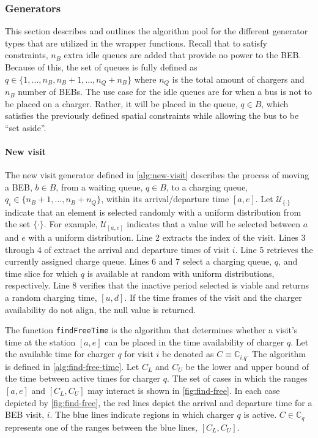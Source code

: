\documentclass[11pt,a4paper,final]{article}
\newcommand{\C}{\mathbb{C}}                 %
\newcommand{\U}{\mathcal{U}}                %
\begin{document}
\subsubsection{Generators}
\label{sec:generators}
This section describes and outlines the algorithm pool for the different generator types that are utilized in the
wrapper functions. Recall that to satisfy constraints, \(n_B\) extra idle queues are added that provide no power to the
BEB. Because of this, the set of queues is fully defined as \(q \in \{1,..., n_B, n_B+1,..., n_Q+n_B\}\) where \(n_Q\) is the
total amount of chargers and \(n_B\) number of BEBs. The use case for the idle queues are for when a bus is not to be
placed on a charger. Rather, it will be placed in the queue, \(q \in B\), which satisfies the previously defined spatial
constraints while allowing the bus to be ``set aside''.

\paragraph{New visit}
\label{sec:new-visit}
The new visit generator defined in \ref{alg:new-visit} describes the process of moving a BEB, \(b \in B\), from a waiting
queue, \(q \in B\), to a charging queue, \(q_i \in \{n_B+1,..., n_B + n_Q\}\), within its arrival/departure time \([a, e]\). Let
\(\U_{\{\cdot\}}\) indicate that an element is selected randomly with a uniform distribution from the set \(\{\cdot\}\). For
example, \(\U_{[a, e]}\) indicates that a value will be selected between \(a\) and \(e\) with a uniform distribution. Line 2
extracts the index of the visit. Lines 3 through 4 of extract the arrival and departure times of visit \(i\). Line 5
retrieves the currently assigned charge queue. Lines 6 and 7 select a charging queue, \(q\), and time slice for which \(q\)
is available at random with uniform distributions, respectively. Line 8 verifies that the inactive period selected is
viable and returns a random charging time, \([u, d]\). If the time frames of the visit and the charger availability do not
align, the null value is returned.

The function \texttt{findFreeTime} is the algorithm that determines whether a visit's time at the station \([a, e]\) can be placed
in the time availability of charger \(q\). Let the available time for charger \(q\) for visit \(i\) be denoted as \(C \equiv
\C_{i.q}\). The algorithm is defined in \ref{alg:find-free-time}. Let \(C_L\) and \(C_U\) be the lower and upper bound of the
time between active times for charger \(q\). The set of cases in which the ranges \([a, e]\) and \([C_L, C_U]\) may interact
is shown in \ref{fig:find-free}. In each case depicted by \ref{fig:find-free}, the red lines depict the arrival and departure time
for a BEB visit, \(i\). The blue lines indicate regions in which charger \(q\) is active. \(C \in \C_q\) represents one of the
ranges between the blue lines, \([C_L, C_U]\).
\end{document}
